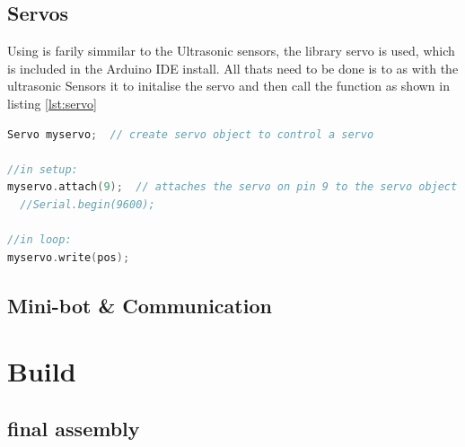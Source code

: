 \section{Servos}

Using is farily simmilar to the Ultrasonic sensors, the library servo is used, which is included in the Arduino IDE install. All thats need to be done is to as with the ultrasonic Sensors it to initalise the servo and then call the \texttt{} function as shown in listing \ref{lst:servo}

\begin{lstlisting}[language=c,caption={New ping usage},label={lst:new_ping}]
Servo myservo;  // create servo object to control a servo

//in setup:
myservo.attach(9);  // attaches the servo on pin 9 to the servo object
  //Serial.begin(9600);

//in loop:
myservo.write(pos); 
\end{lstlisting}

\section{Mini-bot \& Communication}

	\chapter{Build}

\section{final assembly}

